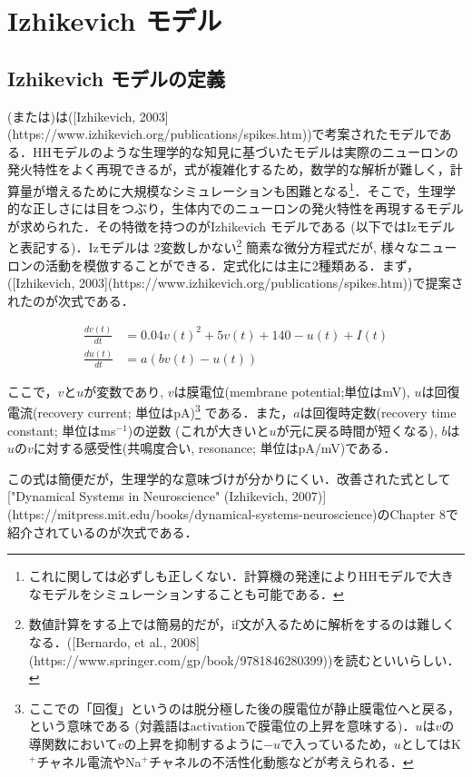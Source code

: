 \section{Izhikevich モデル}
\subsection{Izhikevich モデルの定義}
\textbf{} (または\textbf{})は([Izhikevich, 2003](https://www.izhikevich.org/publications/spikes.htm))で考案されたモデルである．HHモデルのような生理学的な知見に基づいたモデルは実際のニューロンの発火特性をよく再現できるが，式が複雑化するため，数学的な解析が難しく，計算量が増えるために大規模なシミュレーションも困難となる\footnote{これに関しては必ずしも正しくない．計算機の発達によりHHモデルで大きなモデルをシミュレーションすることも可能である．}．そこで，生理学的な正しさには目をつぶり，生体内でのニューロンの発火特性を再現するモデルが求められた．その特徴を持つのがIzhikevich モデルである (以下ではIzモデルと表記する)．Izモデルは 2変数しかない\footnote{数値計算をする上では簡易的だが，if文が入るために解析をするのは難しくなる．([Bernardo, et al., 2008](https://www.springer.com/gp/book/9781846280399))を読むといいらしい．}
簡素な微分方程式だが, 様々なニューロンの活動を模倣することができる．定式化には主に2種類ある．まず，([Izhikevich, 2003](https://www.izhikevich.org/publications/spikes.htm))で提案されたのが次式である．


\begin{align}
\frac{dv(t)}{dt}&=0.04v(t)^2 + 5v(t)+140-u(t)+I(t) \\
\frac{du(t)}{dt}&=a(bv(t)-u(t))
\end{align} 


ここで，$v$と$u$が変数であり, $v$は膜電位(membrane potential;単位はmV), $u$は回復電流(recovery current; 単位はpA)\footnote{ここでの「回復」というのは脱分極した後の膜電位が静止膜電位へと戻る，という意味である (対義語はactivationで膜電位の上昇を意味する)．$u$は$v$の導関数において$v$の上昇を抑制するように$-u$で入っているため，$u$としてはK$^+$チャネル電流やNa$^+$チャネルの不活性化動態などが考えられる．}
である．また，$a$は回復時定数(recovery time constant; 単位はms$^{-1}$)の逆数 (これが大きいと$u$が元に戻る時間が短くなる), $b$は$u$の$v$に対する感受性(共鳴度合い,  resonance; 単位はpA/mV)である．

この式は簡便だが，生理学的な意味づけが分かりにくい．改善された式として["Dynamical Systems in Neuroscience" (Izhikevich, 2007)](https://mitpress.mit.edu/books/dynamical-systems-neuroscience)のChapter 8で紹介されているのが次式である．


